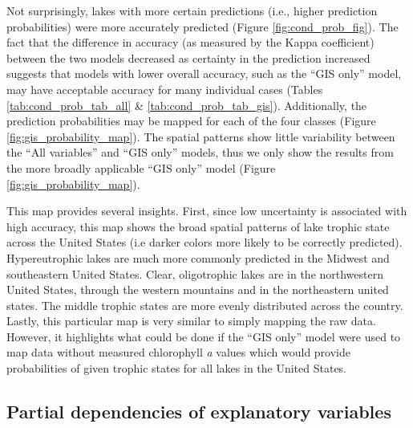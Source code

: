 \documentclass[12pt,]{article}
\begin{document}
Not surprisingly, lakes with more certain predictions (i.e., higher
prediction probabilities) were more accurately predicted (Figure
\ref{fig:cond_prob_fig}). The fact that the difference in accuracy (as
measured by the Kappa coefficient) between the two models decreased as
certainty in the prediction increased suggests that models with lower
overall accuracy, such as the ``GIS only'' model, may have acceptable
accuracy for many individual cases (Tables \ref{tab:cond_prob_tab_all}
\& \ref{tab:cond_prob_tab_gis}). Additionally, the prediction
probabilities may be mapped for each of the four classes (Figure
\ref{fig:gis_probability_map}). The spatial patterns show little
variability between the ``All variables'' and ``GIS only'' models, thus
we only show the results from the more broadly applicable ``GIS only''
model (Figure \ref{fig:gis_probability_map}).

This map provides several insights. First, since low uncertainty is
associated with high accuracy, this map shows the broad spatial patterns
of lake trophic state across the United States (i.e darker colors more
likely to be correctly predicted). Hypereutrophic lakes are much more
commonly predicted in the Midwest and southeastern United States. Clear,
oligotrophic lakes are in the northwestern United States, through the
western mountains and in the northeastern united states. The middle
trophic states are more evenly distributed across the country. Lastly,
this particular map is very similar to simply mapping the raw data.
However, it highlights what could be done if the ``GIS only'' model were
used to map data without measured chlorophyll \emph{a} values which
would provide probabilities of given trophic states for all lakes in the
United States.

\subsection{Partial dependencies of explanatory
variables}\label{partial-dependencies-of-explanatory-variables}
\end{document}
